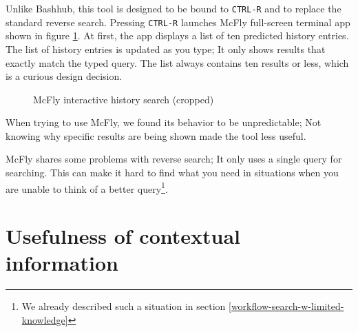 Unlike Bashhub, this tool is designed to be bound to \verb|CTRL-R| and to replace the standard reverse search. Pressing \verb|CTRL-R| launches McFly full-screen terminal app shown in figure \ref{tools-mcfly}. At first, the app displays a list of ten predicted history entries. The list of history entries is updated as you type; It only shows results that exactly match the typed query. The list always contains ten results or less, which is a curious design decision. 


\begin{figure}[h]
  \caption{McFly interactive history search (cropped)}
  \label{tools-mcfly}
\end{figure}


When trying to use McFly, we found its behavior to be unpredictable; Not knowing why specific results are being shown made the tool less useful. 

McFly shares some problems with reverse search; It only uses a single query for searching. This can make it hard to find what you need in situations when you are unable to think of a better query\footnote{We already described such a situation in section \ref{workflow-search-w-limited-knowledge}}. 




\section{Usefulness of contextual information}


